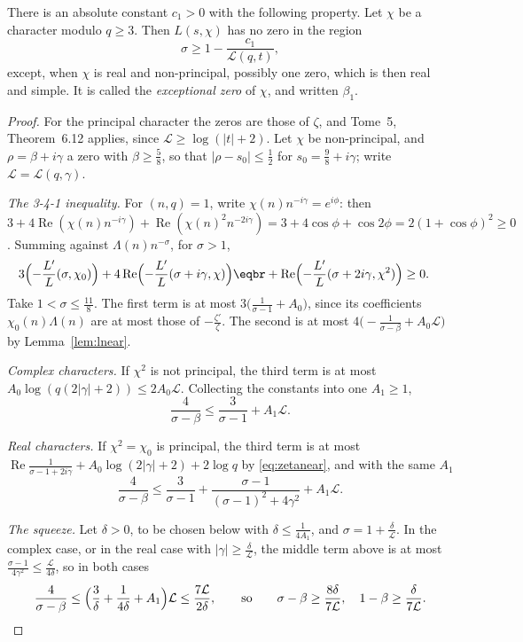 \begin{theorem}\label{thm:lzerofree}
There is an absolute constant $c_1>0$ with the following property. Let $\chi$ be a character modulo $q\ge3$. Then $L(s,\chi)$ has no zero in the region
\[
\sigma\ge1-\frac{c_1}{\mathcal L(q,t)},
\]
except, when $\chi$ is real and non-principal, possibly one zero, which is then real and simple. It is called the \emph{exceptional zero} of $\chi$, and written $\beta_1$.
\end{theorem}

\begin{proof}
For the principal character the zeros are those of $\zeta$, and Tome~5, Theorem~6.12 applies, since $\mathcal L\ge\log(|t|+2)$. Let $\chi$ be non-principal, and $\rho=\beta+i\gamma$ a zero with $\beta\ge\frac58$, so that $|\rho-s_0|\le\frac12$ for $s_0=\frac98+i\gamma$; write $\mathcal L=\mathcal L(q,\gamma)$.

\emph{The 3-4-1 inequality.} For $(n,q)=1$, write $\chi(n)n^{-i\gamma}=e^{i\phi}$: then $3+4\operatorname{Re}(\chi(n)n^{-i\gamma})+\operatorname{Re}(\chi(n)^2n^{-2i\gamma})=3+4\cos\phi+\cos2\phi=2(1+\cos\phi)^2\ge0$. Summing against $\Lambda(n)n^{-\sigma}$, for $\sigma>1$,
\[
\begin{aligned}3\Bigl(-\frac{L'}L(\sigma,\chi_0)\Bigr)&+4\operatorname{Re}\Bigl(-\frac{L'}L(\sigma+i\gamma,\chi)\Bigr)\eqbr+\operatorname{Re}\Bigl(-\frac{L'}L(\sigma+2i\gamma,\chi^2)\Bigr)\ge0.\end{aligned}
\]
Take $1<\sigma\le\frac{11}8$. The first term is at most $3\bigl(\frac1{\sigma-1}+A_0\bigr)$, since its coefficients $\chi_0(n)\Lambda(n)$ are at most those of $-\frac{\zeta'}\zeta$. The second is at most $4\bigl(-\frac1{\sigma-\beta}+A_0\mathcal L\bigr)$ by Lemma~\ref{lem:lnear}.

\emph{Complex characters.} If $\chi^2$ is not principal, the third term is at most $A_0\log(q(2|\gamma|+2))\le2A_0\mathcal L$. Collecting the constants into one $A_1\ge1$,
\[
\frac4{\sigma-\beta}\le\frac3{\sigma-1}+A_1\mathcal L.
\]

\emph{Real characters.} If $\chi^2=\chi_0$ is principal, the third term is at most $\operatorname{Re}\frac1{\sigma-1+2i\gamma}+A_0\log(2|\gamma|+2)+2\log q$ by \eqref{eq:zetanear}, and with the same $A_1$
\[
\frac4{\sigma-\beta}\le\frac3{\sigma-1}+\frac{\sigma-1}{(\sigma-1)^2+4\gamma^2}+A_1\mathcal L.
\]

\emph{The squeeze.} Let $\delta>0$, to be chosen below with $\delta\le\frac1{4A_1}$, and $\sigma=1+\frac\delta{\mathcal L}$. In the complex case, or in the real case with $|\gamma|\ge\frac\delta{\mathcal L}$, the middle term above is at most $\frac{\sigma-1}{4\gamma^2}\le\frac{\mathcal L}{4\delta}$, so in both cases
\[
\frac4{\sigma-\beta}\le\Bigl(\frac3\delta+\frac1{4\delta}+A_1\Bigr)\mathcal L\le\frac{7\mathcal L}{2\delta},\qquad\text{so}\qquad\sigma-\beta\ge\frac{8\delta}{7\mathcal L},\quad1-\beta\ge\frac\delta{7\mathcal L}.
\]


\end{proof}
